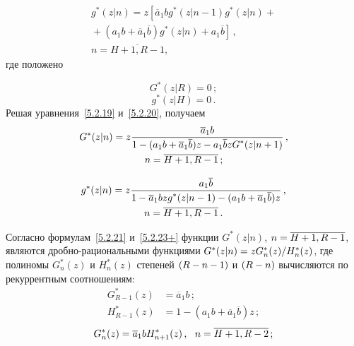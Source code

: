 \begin{multicols}{2}
\vspace*{-12pt}

\noindent
\begin{multline}
g^*(z|n) = z \left[ \overline{a}_1 b g^*(z|n-1) g^*(z|n)
+{}\right.\\
\left.{}+ (a_1 b + \overline{a}_1 \overline{b}) g^*(z|n) +
a_1 \overline{b} \right]\,,\\
n=\overline{H+1,R-1},
\label{5.2.20}
\end{multline}
где положено

\columnbreak

\noindent
\begin{equation}
\label{5.2.21}
G^*(z|R) = 0\,;
\end{equation}
\begin{equation}
\label{5.2.22}
g^*(z|H) = 0\,.
\end{equation}
Решая уравнения~\eqref{5.2.19} и~\eqref{5.2.20}, получаем
\begin{multline}
\label{5.2.23+}
G^*(z|n) = z \displaystyle\frac{\displaystyle  \overline{a}_1 b \mathstrut}{\displaystyle 1 - (a_1 b + \overline{a}_1 \overline{b}) z
- a_1 \overline{b} z G^*(z|n+1) \mathstrut}\,,\\
n=\overline{H+1,R-1}\,;
\end{multline}

\vspace*{-12pt}

\noindent
\begin{multline}
\label{5.2.24+}
g^*(z|n) = z\displaystyle\frac{\displaystyle  a_1 \overline{b} \mathstrut}{\displaystyle 1 - \overline{a}_1 b z g^*(z|n-1)
- (a_1 b + \overline{a}_1 \overline{b}) z \mathstrut}\,,\\
n=\overline{H+1,R-1}\,.
\end{multline}

Согласно формулам~\eqref{5.2.21} и~\eqref{5.2.23+}
функции $G^*(z|n)$, $n\hm=\overline{H+1,R-1}$, являются
дроб\-но-ра\-ци\-о\-наль\-ны\-ми функциями $G^*(z|n)\hm=z G_n^*(z)/H_n^*(z)$, где
полиномы $G_n^*(z)$ и $H_n^*(z)$ степеней $(R\hm-n\hm-1)$ и $(R\hm-n)$ вычисляются
по рекуррентным соотношениям:
\begin{align*}
G_{R-1}^*(z) &= \overline{a}_1 b \,;
\\
H_{R-1}^*(z) &= 1 - (a_1 b + \overline{a}_1 \overline{b}) z\,;
\end{align*}
\begin{equation}
\label{5.2.27}
G_n^*(z) = \overline{a}_1 b H_{n+1}^*(z) \,,\ \ n=\ov{H+1,R-2}\,;
\end{equation}

\vspace*{-12pt}


\end{multicols}
